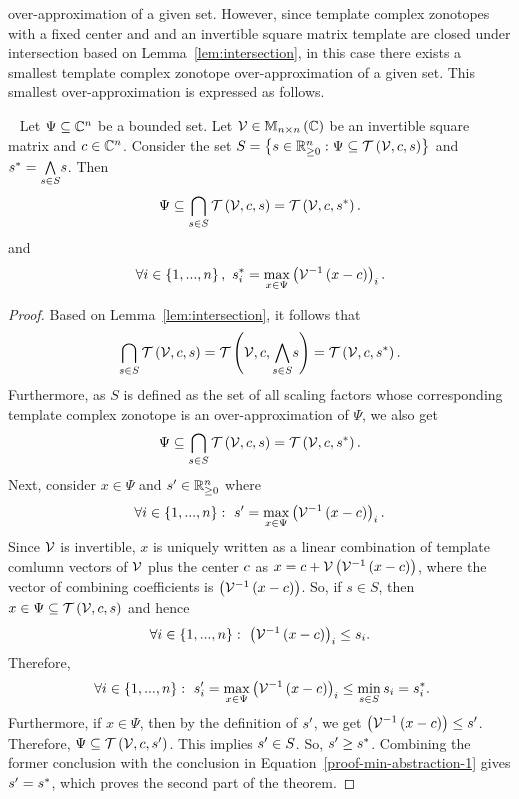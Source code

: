 over-approximation of a given set.  However, since template complex
zonotopes with a fixed center and and an invertible square matrix
template are closed under intersection based on
Lemma~\ref{lem:intersection}, in this case there exists a smallest
template complex zonotope over-approximation of a given set.  This
smallest over-approximation is expressed as follows.
%
\begin{theorem}~\label{thm:min-abstraction}
Let $\Psi\subseteq\mathbb{C}^n$ be a bounded set.  Let
$\mathcal{V}\in\mathbb{M}_{n\times n}\left(\mathbb{C}\right)$ be an invertible square matrix and
$c\in\mathbb{C}^n$.  Consider the set $S=\left\{s\in\mathbb{R}_{\geq
0}^n:\Psi\subseteq\mathit{\operatorname{\mathcal{T}}}\left(\mathcal{V},c,s\right)\right\}$ and
$s^*=\underset{s\in S}{\bigwedge} s$.  Then
%
\begin{equation}
\Psi\subseteq\bigcap_{s\in S}\mathit{\operatorname{\mathcal{T}}}\left(\mathcal{V},c,s\right)=\mathit{\operatorname{\mathcal{T}}}\left(\mathcal{V},c,s^*\right).
\end{equation}
%
and
%
\begin{equation}
\forall i\in\left\{1,...,n\right\},~s^*_i=\max_{x\in\Psi}\left({\mathcal{V}}^{-1}\left(x-c\right)\right)_i.
\end{equation}
%
\end{theorem}
%
\begin{proof}
Based on Lemma~\ref{lem:intersection}, it follows that
%
\[
\bigcap_{s\in
S}\mathit{\operatorname{\mathcal{T}}}\left(\mathcal{V},c,s\right)=\mathit{\operatorname{\mathcal{T}}}\left(\mathcal{V},c,\underset{s\in
S}{\bigwedge}s\right)=\mathit{\operatorname{\mathcal{T}}}\left(\mathcal{V},c,s^*\right).
\]
%
Furthermore, as $S$ is defined as the set of all scaling factors
whose corresponding template complex zonotope is an over-approximation
of $\Psi$, we also get
%
\[
\Psi\subseteq\bigcap_{s\in S}\mathit{\operatorname{\mathcal{T}}}\left(\mathcal{V},c,s\right)=\mathit{\operatorname{\mathcal{T}}}\left(\mathcal{V},c,s^*\right).
\]
%
Next, consider $x\in\Psi$ and $s^\prime\in\mathbb{R}_{\geq 0}^n$ where
%
\[
\forall
i\in\left\{1,...,n\right\}:~s^\prime=\max_{x\in\Psi}\left({\mathcal{V}}^{-1}\left(x-c\right)\right)_i.
\]
%
Since $\mathcal{V}$ is invertible, $x$ is uniquely written as a linear
combination of template comlumn vectors of $\mathcal{V}$ plus the center
$c$ as $x=c+\mathcal{V}\left({\mathcal{V}}^{-1}\left(x-c\right)\right)$, where the
vector of combining coefficients is
$\left({\mathcal{V}}^{-1}\left(x-c\right)\right)$.  So, if $s\in S$, then 
$x\in\Psi\subseteq\mathit{\operatorname{\mathcal{T}}}\left(\mathcal{V},c,s\right)$ and hence \[\forall
i\in\left\{1,...,n\right\}:~\left({\mathcal{V}}^{-1}\left(x-c\right)\right)_i\leq s_i.\]
Therefore,
%
\begin{equation}~\label{proof-min-abstraction-1}
\forall
i\in\left\{1,...,n\right\}:~s^\prime_i=\max_{x\in\Psi}\left({\mathcal{V}}^{-1}\left(x-c\right)\right)_i\leq\min_{s\in
S}s_i=s^*_i.
\end{equation}
%
Furthermore, if $x\in\Psi$, then by the definition of $s^\prime$, we
get $\left({\mathcal{V}}^{-1}\left(x-c\right)\right)\leq s^\prime$.  Therefore,
$\Psi\subseteq\mathit{\operatorname{\mathcal{T}}}\left(\mathcal{V},c,s^\prime\right)$.  This implies
$s^\prime\in S$.  So, $s^\prime\geq s^*$.  Combining the
former conclusion with the conclusion in
Equation~\ref{proof-min-abstraction-1} gives $s^\prime=s^*$,
which proves the second part of the theorem.
\end{proof}


